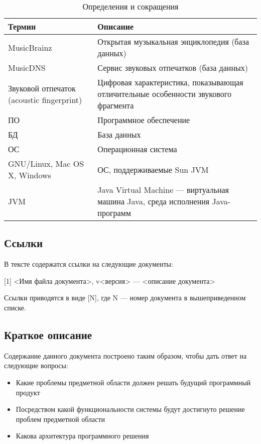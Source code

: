 \documentclass[pdftex,12pt,a4paper]{report}
\begin{document}
\begin{table}[h]  %
\caption{Определения и сокращения}
\begin{tabular}{|p{4cm}|p{10cm}|} \hline
Термин & Описание \\ \hline
MusicBrainz & Открытая музыкальная энциклопедия (база данных) \\ \hline
MusicDNS    & Сервис звуковых отпечатков (база данных) \\ \hline
Звуковой отпечаток (acoustic fingerprint) & Цифровая характеристика, показывающая отличительные особенности звукового фрагмента \\ \hline
ПО & Программное обеспечение \\ \hline
БД & База данных \\ \hline
ОС & Операционная система \\ \hline
GNU/Linux, Mac OS X, Windows & ОС, поддерживаемые Sun JVM \\ \hline
JVM & Java Virtual Machine --- виртуальная машина Java, среда исполнения Java-программ \\ \hline
\end{tabular}
\end{table}

\subsection{Ссылки}
В тексте содержатся ссылки на следующие документы:

[1]	<Имя файла документа>, v<версия> --- <описание документа>

Ссылки приводятся в виде [N], где N --- номер документа в вышеприведенном списке.

\subsection{Краткое описание}
Содержание данного документа построено таким образом, чтобы дать ответ на следующие вопросы:

\begin{itemize}
	\item Какие проблемы предметной области должен решать будущий программный продукт
	\item Посредством какой функциональности системы будут достигнуто решение проблем предметной области
	\item Какова архитектура программного решения
\end{itemize}
\end{document}
